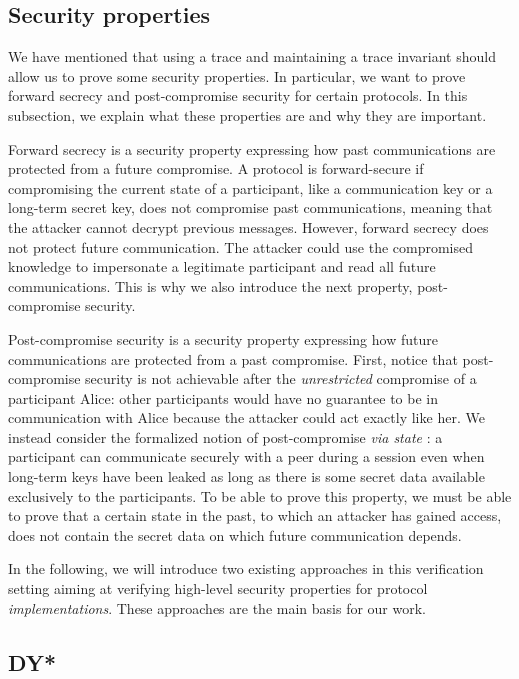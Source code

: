 \subsection{Security properties}
\label{sec:security-properties-def}

We have mentioned that using a trace and maintaining a trace invariant should allow us to prove some security properties.
In particular, we want to prove forward secrecy and post-compromise security for certain protocols. In this subsection, we explain what these properties are and why they are important.

Forward secrecy is a security property expressing how past communications are protected from a future compromise.
A protocol is forward-secure if compromising the current state of a participant, like a communication key or a long-term secret key, does not compromise past communications, meaning that the attacker cannot decrypt previous messages.
However, forward secrecy does not protect future communication. The attacker could use the compromised knowledge to impersonate a legitimate participant and read all future communications.
This is why we also introduce the next property, post-compromise security.

Post-compromise security is a security property expressing how future communications are protected from a past compromise.
First, notice that post-compromise security is not achievable after the \emph{unrestricted} compromise of a participant Alice: other participants would have no guarantee to be in communication with Alice because the attacker could act exactly like her.
We instead consider the formalized notion of post-compromise \emph{via state} \cite{}:
a participant can communicate securely with a peer during a session even when long-term keys have been leaked as long as there is some secret data available exclusively to the participants.
To be able to prove this property, we must be able to prove that a certain state in the past, to which an attacker has gained access, does not contain the secret data on which future communication depends.

In the following, we will introduce two existing approaches in this verification setting aiming at verifying high-level security properties for protocol \emph{implementations}. These approaches are the main basis for our work.

\subsection{DY*}
\label{sec:dy-star}

